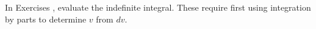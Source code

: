 {\noindent In Exercises}
{, evaluate the indefinite integral. These require first using integration by parts to determine $v$ from $dv$.}
